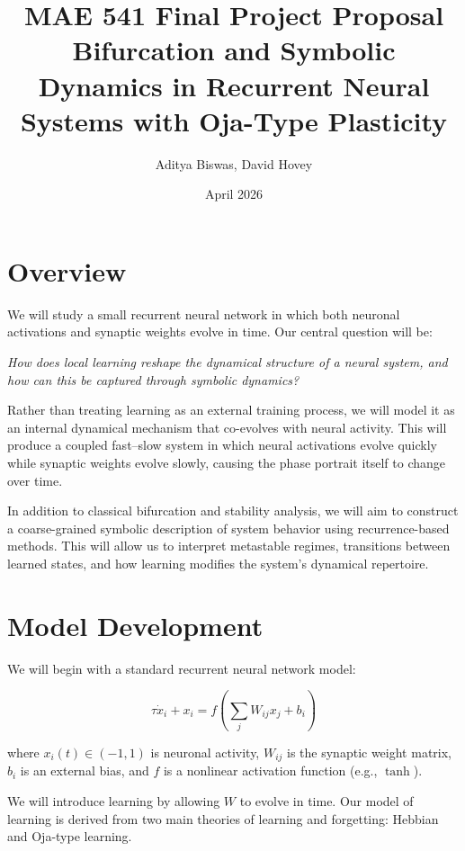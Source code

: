 \documentclass{article}
\title{MAE 541 Final Project Proposal \\[0.5em] \Large Bifurcation and Symbolic Dynamics in Recurrent Neural Systems with Oja-Type Plasticity}
\author{Aditya Biswas, David Hovey}
\date{April 2026}
\begin{document}
\maketitle

\section*{Overview}

We will study a small recurrent neural network in which both neuronal activations and synaptic weights evolve in time. Our central question will be:

\begin{center}
\textit{How does local learning reshape the dynamical structure of a neural system, and how can this be captured through symbolic dynamics?}
\end{center}

Rather than treating learning as an external training process, we will model it as an internal dynamical mechanism that co-evolves with neural activity. This will produce a coupled fast--slow system in which neural activations evolve quickly while synaptic weights evolve slowly, causing the phase portrait itself to change over time.

In addition to classical bifurcation and stability analysis, we will aim to construct a coarse-grained symbolic description of system behavior using recurrence-based methods. This will allow us to interpret metastable regimes, transitions between learned states, and how learning modifies the system's dynamical repertoire.

\section*{Model Development}

We will begin with a standard recurrent neural network model:

\begin{equation}
\tau \dot{x}_i + x_i = f\!\left(\sum_j W_{ij} x_j + b_i\right)
\end{equation}

where $x_i(t)\in(-1,1)$ is neuronal activity, $W_{ij}$ is the synaptic weight matrix, $b_i$ is an external bias, and $f$ is a nonlinear activation function (e.g., $\tanh$).

We will introduce learning by allowing $W$ to evolve in time. Our model of learning is derived from two main theories of learning and forgetting: Hebbian and Oja-type learning.
\end{document}
